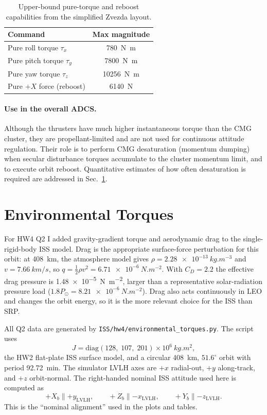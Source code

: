 \documentclass[conference]{IEEEtran}
\begin{document}
\begin{table}[h]
\centering
\caption{Upper-bound pure-torque and reboost capabilities from the
simplified Zvezda layout.}
\label{tab:thr-capacity}
\begin{tabular}{@{}lc@{}}
\toprule
Command & Max magnitude \\
\midrule
Pure roll torque $\tau_x$     & \SI{780}{N.m}  \\
Pure pitch torque $\tau_y$    & \SI{7800}{N.m} \\
Pure yaw torque $\tau_z$      & \SI{10256}{N.m} \\
Pure $+X$ force (reboost)     & \SI{6140}{N}  \\
\bottomrule
\end{tabular}
\end{table}

\paragraph{Use in the overall ADCS.}  Although the thrusters have much
higher instantaneous torque than the CMG cluster, they are
propellant-limited and are not used for continuous attitude regulation.
Their role is to perform CMG desaturation (momentum dumping) when
secular disturbance torques accumulate to the cluster momentum limit,
and to execute orbit reboost.  Quantitative estimates of how often
desaturation is required are addressed in
Sec.~\ref{sec:environmental}.

\section{Environmental Torques}
\label{sec:environmental}

For HW4 Q2 I added gravity-gradient torque and aerodynamic drag to the
single-rigid-body ISS model.  Drag is the appropriate surface-force
perturbation for this orbit: at \SI{408}{km}, the atmosphere model gives
$\rho=\SI{2.28e-13}{kg.m^{-3}}$ and
$v=\SI{7.66}{km/s}$, so
$q=\frac12\rho v^2=\SI{6.71e-6}{N.m^{-2}}$.  With $C_D=2.2$ the
effective drag pressure is \SI{1.48e-5}{N.m^{-2}}, larger than a
representative solar-radiation pressure load
($1.8P_\odot=\SI{8.21e-6}{N.m^{-2}}$).  Drag also acts continuously in
LEO and changes the orbit energy, so it is the more relevant choice for
the ISS than SRP.

All Q2 data are generated by
\texttt{ISS/hw4/environmental\_torques.py}.  The script uses
\[
  J=\mathrm{diag}(128,\;107,\;201)\times 10^6\ \si{kg.m^2},
\]
the HW2 flat-plate ISS surface model, and a circular \SI{408}{km},
$51.6^\circ$ orbit with period \SI{92.72}{min}.  The simulator LVLH
axes are $+x$ radial-out, $+y$ along-track, and $+z$ orbit-normal.  The
right-handed nominal ISS attitude used here is computed as
\[
  +X_b \parallel +y_\text{LVLH}, \qquad
  +Z_b \parallel -x_\text{LVLH}, \qquad
  +Y_b \parallel -z_\text{LVLH}.
\]
This is the ``nominal alignment'' used in the plots and tables.
\end{document}
